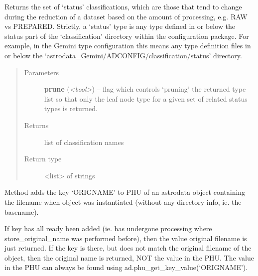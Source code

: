 \documentclass[letterpaper,10pt,english]{sphinxmanual}
\begin{document}
\begin{fulllineitems}

\begin{fulllineitems}
\label{astro_class:astrodata.AstroData.status}
Returns the set of `status' classifications, which are those that 
tend to change during the reduction of a dataset based on 
the amount of processing, e.g. RAW vs PREPARED.  Strictly, a `status' 
type is any type defined in or below the status part of the 
`classification' directory within the configuration package. For 
example, in the Gemini type configuration this means any type definition
files in or below the `astrodata\_Gemini/ADCONFIG/classification/status'
directory.
\begin{quote}\begin{description}
\item[{Parameters}] \leavevmode
\textbf{prune} (\emph{\textless{}bool\textgreater{}}) -- flag which controls `pruning' the returned type list 
so that only the leaf node type for a given set of 
related status types is returned.

\item[{Returns}] \leavevmode
list of classification names

\item[{Return type}] \leavevmode
\textless{}list\textgreater{} of strings

\end{description}\end{quote}

\end{fulllineitems}


\begin{fulllineitems}
\label{astro_class:astrodata.AstroData.store_original_name}
Method adds the key `ORIGNAME' to PHU of an astrodata object 
containing the filename when object was instantiated (without any 
directory info, ie. the basename).

If key has all ready been added (ie. has undergone processing where
store\_original\_name was performed before), then the value original 
filename is just returned.  If the key is there, but does not match
the original filename of the object, then the original name is 
returned, NOT the value in the PHU. The value in the PHU can always be
found using ad.phu\_get\_key\_value(`ORIGNAME').


\end{fulllineitems}
\end{fulllineitems}
\end{document}
